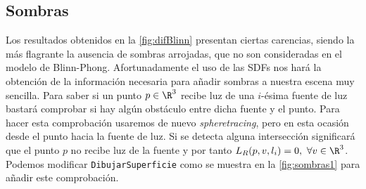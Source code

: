 \subsection{Sombras}
Los resultados obtenidos en la \autoref{fig:difBlinn} presentan ciertas carencias, siendo la más flagrante la ausencia de sombras arrojadas, que no son consideradas en el modelo de Blinn-Phong. Afortunadamente el uso de las SDFs nos hará la obtención de la información necesaria para añadir sombras a nuestra escena muy sencilla. Para saber si un punto $p\in\R^3$ recibe luz de una $i$-ésima fuente de luz bastará comprobar si hay algún obstáculo entre dicha fuente y el punto. Para hacer esta comprobación usaremos de nuevo \textit{spheretracing}, pero en esta ocasión desde el punto hacia la fuente de luz. Si se detecta alguna intersección significará que el punto $p$ no recibe luz de la fuente y por tanto $L_R(p,v,l_i) = 0,\ \forall v\in \R^3$. Podemos modificar \texttt{DibujarSuperficie} como se muestra en la \autoref{fig:sombras1} para añadir este comprobación.\newline

